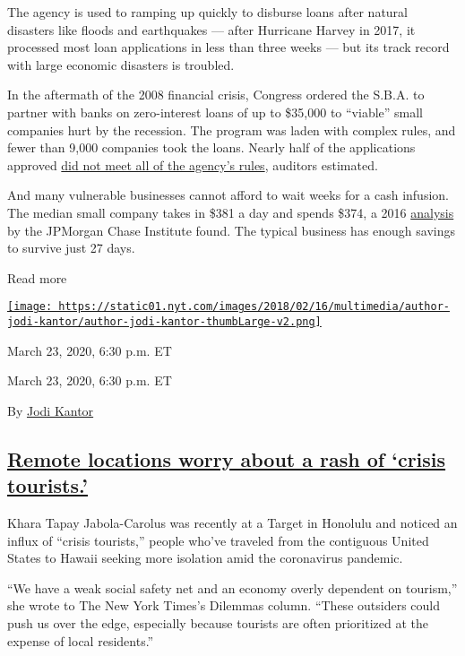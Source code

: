 The agency is used to ramping up quickly to disburse loans after natural
disasters like floods and earthquakes --- after Hurricane Harvey in
2017, it processed most loan applications in less than three weeks ---
but its track record with large economic disasters is troubled.

In the aftermath of the 2008 financial crisis, Congress ordered the
S.B.A. to partner with banks on zero-interest loans of up to \$35,000 to
``viable'' small companies hurt by the recession. The program was laden
with complex rules, and fewer than 9,000 companies took the loans.
Nearly half of the applications approved
\href{https://boss.blogs.nytimes.com/2011/05/02/a-r-c-loans-gone-but-hardly-forgotten/}{did
not meet all of the agency's rules}, auditors estimated.

And many vulnerable businesses cannot afford to wait weeks for a cash
infusion. The median small company takes in \$381 a day and spends
\$374, a 2016
\href{http://jpmorganchase.com/corporate/institute/document/jpmc-institute-small-business-report.pdf}{analysis}
by the JPMorgan Chase Institute found. The typical business has enough
savings to survive just 27 days.

Read more

\href{https://www.nytimes.com/by/jodi-kantor}{\texttt{[image: https://static01.nyt.com/images/2018/02/16/multimedia/author-jodi-kantor/author-jodi-kantor-thumbLarge-v2.png]}}

March 23, 2020, 6:30 p.m. ET

March 23, 2020, 6:30 p.m. ET

By \href{https://www.nytimes.com/by/jodi-kantor}{Jodi Kantor}

\hypertarget{remote-locations-worry-about-a-rash-of-crisis-tourists}{%
\subsection{\texorpdfstring{\protect\hyperlink{remote-locations-worry-about-a-rash-of-crisis-tourists}{Remote
locations worry about a rash of `crisis
tourists.'}}{Remote locations worry about a rash of `crisis tourists.'}}\label{remote-locations-worry-about-a-rash-of-crisis-tourists}}

Khara Tapay Jabola-Carolus was recently at a Target in Honolulu and
noticed an influx of ``crisis tourists,'' people who've traveled from
the contiguous United States to Hawaii seeking more isolation amid the
coronavirus pandemic.

``We have a weak social safety net and an economy overly dependent on
tourism,'' she wrote to The New York Times's Dilemmas column. ``These
outsiders could push us over the edge, especially because tourists are
often prioritized at the expense of local residents.''

